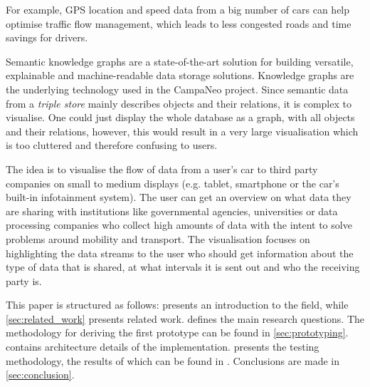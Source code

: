 \documentclass[../paper.tex]{subfiles}
\begin{document}
  For example, GPS location and speed data from a big number of cars can help
  optimise traffic flow management, which leads to less congested roads and
  time savings for drivers.

  Semantic knowledge graphs are a state-of-the-art solution for building
  versatile, explainable and machine-readable data storage solutions. Knowledge
  graphs are the underlying technology used in the CampaNeo project. Since
  semantic data from a \textit{triple store} mainly describes objects and their
  relations, it is complex to visualise. One could just display the whole
  database as a graph, with all objects and their relations, however, this
  would result in a very large visualisation which is too cluttered and
  therefore confusing to users. %

  The idea is to visualise the flow of data from a user’s car to third party
  companies on small to medium displays (e.g. tablet, smartphone or the car’s
  built-in infotainment system). The user can get an overview on what data they
  are sharing with institutions like governmental agencies, universities or
  data processing companies who collect high amounts of data with the intent to
  solve problems around mobility and transport. The visualisation
  focuses on highlighting the data streams to the user who should get
  information about the type of data that is shared, at what intervals it is
  sent out and who the receiving party is.

  This paper is structured as follows:  presents an
  introduction to the field, while \cref{sec:related_work} presents related
  work.  defines the main research questions. The
  methodology for deriving the first prototype can be found in
  \cref{sec:prototyping}.  contains architecture
  details of the implementation.  presents the
  testing methodology, the results of which can be found in .
  Conclusions are made in \cref{sec:conclusion}.
\end{document}
